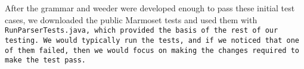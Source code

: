 \documentclass[12pt]{article}
\begin{document}
After the grammar and weeder were developed enough to pass these initial test cases, we downloaded the public Marmoset tests and used them with \tt{RunParserTests.java}, which provided the basis of the rest of our testing. We would typically run the tests, and if we noticed that one of them failed, then we would focus on making the changes required to make the test pass.
\end{document}
